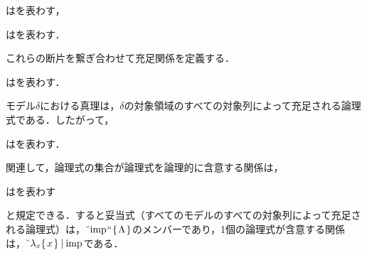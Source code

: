 \begin{df}
\label{df:真理関数の充足関係}
はを表わす，
\end{df}

\begin{df}
\label{df:普遍量化の充足関係}
はを表わす．
\end{df}

\noindent これらの断片を繋ぎ合わせて充足関係を定義する．

\begin{df}
\label{df:充足関係}
はを表わす．
\end{df}

\noindent モデル$\delta$における真理は，$\delta$の対象領域のすべての対象列によって充足される論理式である．したがって，

\begin{df}
\label{df:真理集合}
はを表わす．
\end{df}

\noindent 関連して，論理式の集合が論理式を論理的に含意する関係は，
\begin{df}
\label{df:論理的含意関係}
はを表わす
\end{df}
\noindent と規定できる．すると妥当式（すべてのモデルのすべての対象列によって充足される論理式）は，$ \breve{\:\:}\mathrm{imp}{\mspace{1mu}{``}\mspace{1mu}}\{\mspace{2mu}\Lambda\mspace{2mu}\} $のメンバーであり，1個の論理式が含意する関係は，$ \breve{\:\:}\lambda_x\{\mspace{2mu}x\mspace{2mu}\}\mathbin{\mid}\mathrm{imp} $である．


